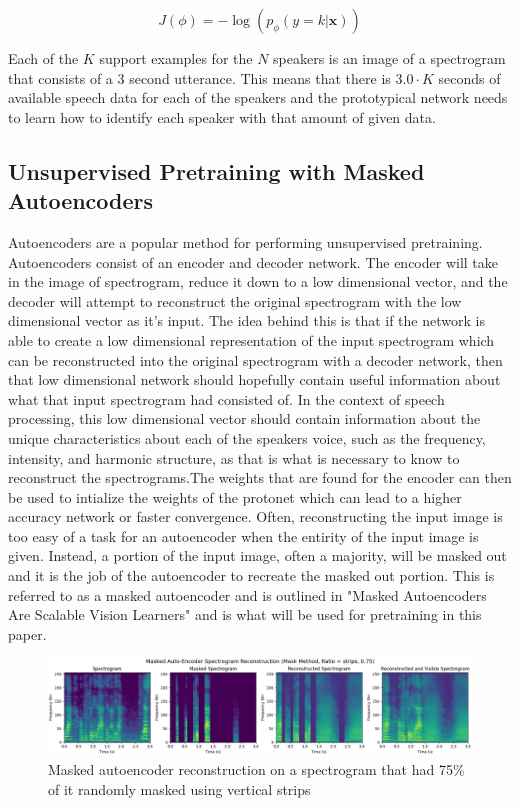 \documentclass{article}
\begin{document}
\begin{equation}
  J\left(\phi\right) = - \log \left(p_\phi\left(y=k | \mathbf{x}\right)\right)
  \label{eq:prototypical_loss}
\end{equation}

Each of the $K$ support examples for the $N$ speakers is an image of a spectrogram that consists of a 3 second utterance.
This means that there is $3.0 \cdot K$ seconds of available speech data for each of the speakers and the prototypical
network needs to learn how to identify each speaker with that amount of given data.

\subsection{Unsupervised Pretraining with Masked Autoencoders}
Autoencoders are a popular method for performing unsupervised pretraining. Autoencoders consist of an encoder and decoder
network. The encoder will take in the image of spectrogram, reduce it down to a low dimensional vector, and the decoder
will attempt to reconstruct the original spectrogram with the low dimensional vector as it's input. The idea behind this
is that if the network is able to create a low dimensional representation of the input spectrogram which can be reconstructed
into the original spectrogram with a decoder network, then that low dimensional network should hopefully contain useful 
information about what that input spectrogram had consisted of. In the context of speech processing, this low dimensional 
vector should contain information about the unique characteristics about each of the speakers voice, such as the frequency, 
intensity, and harmonic structure, as that is what is necessary to know to reconstruct the spectrograms.The weights that 
are found for the encoder can then be used to intialize the weights of the protonet which can lead to a higher accuracy 
network or faster convergence. Often, reconstructing the input image is too easy of a task for an autoencoder when the 
entirity of the input image is given. Instead, a portion of the input image, often a majority, will be masked out and it 
is the job of the autoencoder to recreate the masked out portion. This is referred to as a masked autoencoder and is 
outlined in "Masked Autoencoders Are Scalable Vision Learners" \cite{MAE} and is what will be used for pretraining in this paper.

\begin{figure}
  \centering
  \includegraphics[width=1.0\textwidth]{Images/mae_mask_strips_mask_ratio_75_lr_005_batch_64.png}
  \caption{Masked autoencoder reconstruction on a spectrogram that had 75\% of it randomly masked using vertical strips}
  \label{fig:MAEStrips}
\end{figure}
\end{document}
